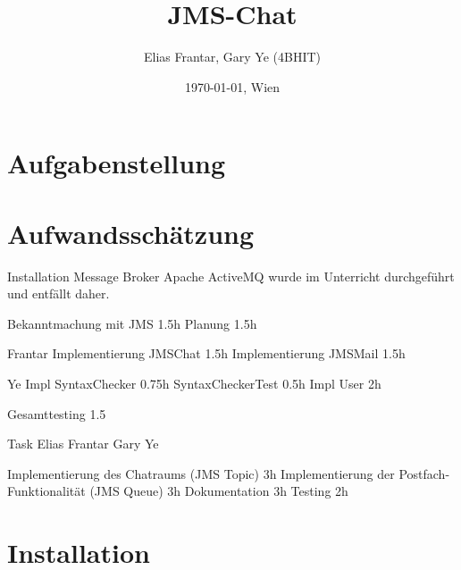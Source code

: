 \documentclass[11pt, a4paper]{article}
\title{JMS-Chat}
\author{Elias Frantar, Gary Ye (4BHIT)}
\date{\today{}, Wien}
\begin{document}
\lstset{basicstyle=\ttfamily\small,
        keywordstyle=,
        commentstyle=\itshape,
        numbers=left,                   %
        stepnumber=1,					%
        linebreak=true,					%
        numberstyle=\tiny,				%
        showstringspaces=false,			
        abovecaptionskip=0pt,
        belowcaptionskip=0pt,
        xleftmargin=\parindent,
        fontadjust}

\maketitle
\newpage
\tableofcontents
\newpage

\section{Aufgabenstellung}

\section{Aufwandsschätzung}
Installation Message Broker Apache ActiveMQ wurde im Unterricht durchgeführt und entfällt daher.

Bekanntmachung mit JMS 1.5h
Planung 1.5h

Frantar
Implementierung JMSChat 1.5h
Implementierung JMSMail 1.5h

Ye
Impl SyntaxChecker 0.75h
SyntaxCheckerTest 0.5h
Impl User 2h

Gesamttesting 1.5

Task Elias Frantar Gary Ye



Implementierung des Chatraums (JMS Topic) 3h
Implementierung der Postfach-Funktionalität (JMS Queue) 3h
Dokumentation 3h
Testing 2h
\section{Installation}
\end{document}
